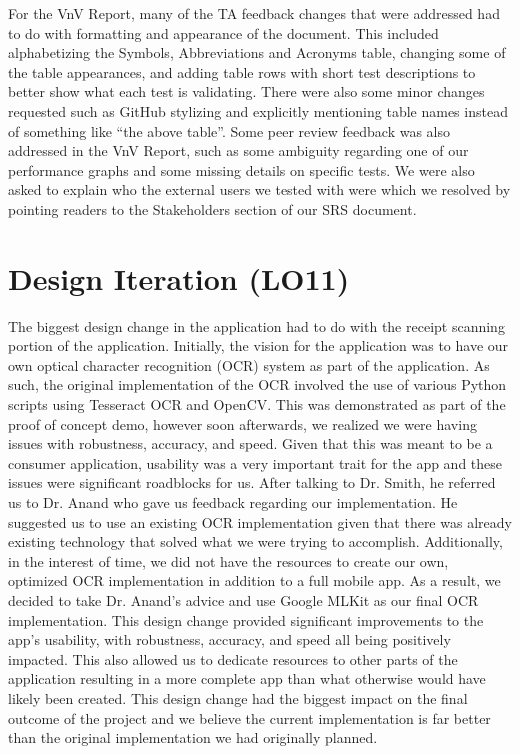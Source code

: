 \documentclass{article}
\begin{document}
For the VnV Report, many of the TA feedback changes that were addressed had to do with formatting and
appearance of the document. This included alphabetizing the Symbols, Abbreviations and Acronyms table,
changing some of the table appearances, and adding table rows with short test descriptions to better show
what each test is validating. There were also some minor changes requested such as GitHub stylizing and
explicitly mentioning table names instead of something like ``the above table''. Some peer review feedback
was also addressed in the VnV Report, such as some ambiguity regarding one of our performance graphs and some
missing details on specific tests. We were also asked to explain who the external users we tested with were which
we resolved by pointing readers to the Stakeholders section of our SRS document.

\section{Design Iteration (LO11)}


The biggest design change in the application had to do with the receipt scanning portion of the
application. Initially, the vision for the application was to have our own optical character recognition (OCR)
system as part of the application. As such, the original implementation of the OCR involved the use
of various Python scripts using Tesseract OCR and OpenCV. This was demonstrated as part of the proof of concept demo,
however soon afterwards, we realized we were having issues with robustness, accuracy, and speed. Given that this
was meant to be a consumer application, usability was a very important trait for the app and these issues
were significant roadblocks for us. After talking to Dr. Smith, he referred us to Dr. Anand who gave us
feedback regarding our implementation. He suggested us to use an existing OCR implementation given
that there was already existing technology that solved what we were trying to accomplish. Additionally, in the interest of time,
we did not have the resources to create our own, optimized OCR implementation in addition to a full
mobile app. As a result, we decided to take Dr. Anand's advice and use Google MLKit as our final OCR implementation. This
design change provided significant improvements to the app's usability, with robustness, accuracy, and speed all being
positively impacted. This also allowed us to dedicate resources to other parts of the application resulting in a
more complete app than what otherwise would have likely been created. This design change had the biggest impact on
the final outcome of the project and we believe the current implementation is far better than the original implementation
we had originally planned.
\end{document}
